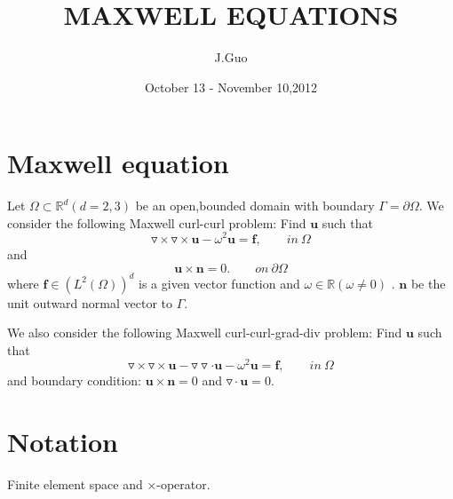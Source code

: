 \documentclass[a4paper,11pt]{article}
\begin{document}
\tableofcontents  %
\title{MAXWELL EQUATIONS}
\author{J.Guo}
\date{October 13 - November 10,2012}
\maketitle
\section{Maxwell equation}
Let $\Omega\subset\mathbb{R}^d (d=2,3)$ be an open,bounded domain with boundary $\Gamma=\partial\Omega.$
We consider the following Maxwell curl-curl problem: Find $\mathbf{u}$ such that
\begin{equation}\label{eq:cc}
\triangledown\times\triangledown\times \textbf{u} - \omega^2\mathbf{u} = \mathbf{f}, \qquad  in\ \Omega
\end{equation}
and
\begin{equation}\label{eq:cc-bc}
\mathbf{u}\times\mathbf{n} = 0. \qquad on \ \partial \Omega
\end{equation}
where $\mathbf{f}\in(L^2(\Omega))^d$ is a given vector function and $\omega\in \mathbb{R} (\omega\neq 0)$ .
$\mathbf{n}$ be the unit outward normal vector to $\Gamma$.

We also consider the following Maxwell curl-curl-grad-div problem: Find $\mathbf{u}$ such that
\begin{equation}\label{eq:ccgd}
\triangledown\times\triangledown\times \textbf{u} - \triangledown\triangledown\cdot\mathbf{u} - \omega^2\mathbf{u} = \mathbf{f}, \qquad  in\ \Omega
\end{equation}
and boundary condition: $\mathbf{u}\times\mathbf{n} = 0$ and $\triangledown\cdot\mathbf{u} = 0$.

\section{Notation}
Finite element space and $\times$-operator.
\end{document}
